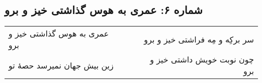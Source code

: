\begin{center}
\section*{شماره ۶: عمری به  هوس گذاشتی خیز و برو}
\label{sec:006}
\begin{longtable}{l p{0.5cm} r}
عمری به هوس گذاشتی خیز و برو
&&
سر برکِه و مِه فراشتی خیز و برو
\\
زین بیش جهان نمیرسد حصهٔ تو
&&
چون نوبت خویش داشتی خیز و برو
\\
\end{longtable}
\end{center}
